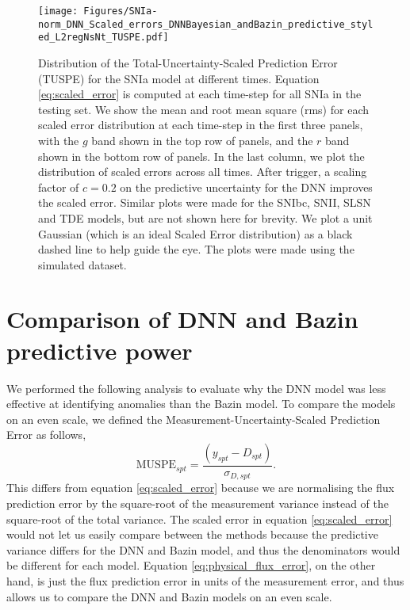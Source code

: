 \documentclass[fleqn,usenatbib]{mnras}
\begin{document}
\begin{figure*}
    \centering
    \texttt{[image: Figures/SNIa-norm\_DNN\_Scaled\_errors\_DNNBayesian\_andBazin\_predictive\_styled\_L2regNsNt\_TUSPE.pdf]}
    \caption{Distribution of the Total-Uncertainty-Scaled Prediction Error (TUSPE) for the SNIa model at different times. Equation \ref{eq:scaled_error} is computed at each time-step for all SNIa in the testing set. We show the mean and root mean square (rms) for each scaled error distribution at each time-step in the first three panels, with the $g$ band shown in the top row of panels, and the $r$ band shown in the bottom row of panels. In the last column, we plot the distribution of scaled errors across all times. After trigger, a scaling factor of $c=0.2$ on the predictive uncertainty for the DNN improves the scaled error. Similar plots were made for the SNIbc, SNII, SLSN and TDE models, but are not shown here for brevity. We plot a unit Gaussian (which is an ideal Scaled Error distribution) as a black dashed line to help guide the eye. The plots were made using the simulated dataset.}
    \label{fig:Scaled_errors}
\end{figure*}

\section{Comparison of DNN and Bazin predictive power}
\label{sec:Appendix_Comparison_of_DNN_and_Bazin}
    We performed the following analysis to evaluate why the DNN model was less effective at identifying anomalies than the Bazin model. To compare the models on an even scale, we defined the Measurement-Uncertainty-Scaled Prediction Error as follows,
        \begin{equation}
                \mathrm{MUSPE}_{spt} = \frac{(y_{spt} - D_{spt})} {\sigma_{D,{spt}}}.
        \label{eq:physical_flux_error}
        \end{equation}
    This differs from equation \ref{eq:scaled_error} because we are normalising the flux prediction error by the square-root of the measurement variance instead of the square-root of the total variance. The scaled error in equation \ref{eq:scaled_error} would not let us easily compare between the methods because the predictive variance differs for the DNN and Bazin model, and thus the denominators would be different for each model. Equation \ref{eq:physical_flux_error}, on the other hand, is just the flux prediction error in units of the measurement error, and thus allows us to compare the DNN and Bazin models on an even scale.
    
\end{document}
